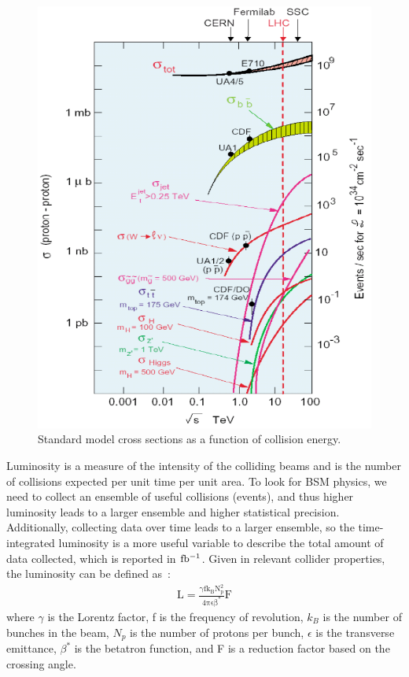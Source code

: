 \begin{figure}
\begin{center}
\includegraphics[width=0.7\linewidth]{figs/SMxsecs.png}
\caption{Standard model cross sections as a function of collision energy.}
\label{figs:SMxsecs}
\end{center}
\end{figure}


  
Luminosity is a measure of the intensity of the colliding beams and is the number of collisions expected per unit time per unit area.  
To look for BSM physics, we need to collect an ensemble of useful collisions (events), and thus higher luminosity leads to a larger ensemble and higher statistical precision.  
Additionally, collecting data over time leads to a larger ensemble, so the time-integrated luminosity is a more useful variable to describe the total amount of data collected, 
which is reported in $\mathrm{fb^{-1}}$.  Given in relevant collider properties, the luminosity can be defined as~\cite{Bayatian:922757}: 
\begin{eqnarray}
\mathrm{L = \frac{\gamma f k_{B} N_{p}^{2}}{4 \pi \epsilon \beta^{*}} F}
\end{eqnarray}  
where $\gamma$ is the Lorentz factor,  f is the frequency of revolution, $k_{B}$ is the number of bunches in the beam, $N_{p}$ is the number of protons per bunch, 
$\epsilon$ is the transverse emittance, $\beta^{*}$ is the betatron function, and F is a reduction factor based on the crossing angle.  

